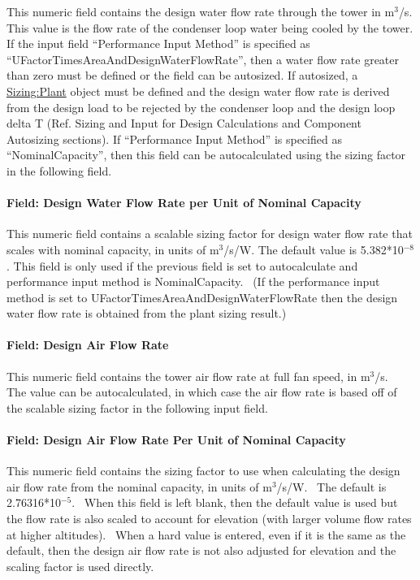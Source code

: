 This numeric field contains the design water flow rate through the tower in m\(^{3}\)/s. This value is the flow rate of the condenser loop water being cooled by the tower. If the input field ``Performance Input Method'' is specified as ``UFactorTimesAreaAndDesignWaterFlowRate'', then a water flow rate greater than zero must be defined or the field can be autosized. If autosized, a \hyperref[sizingplant]{Sizing:Plant} object must be defined and the design water flow rate is derived from the design load to be rejected by the condenser loop and the design loop delta T (Ref. Sizing and Input for Design Calculations and Component Autosizing sections). If ``Performance Input Method'' is specified as ``NominalCapacity'', then this field can be autocalculated using the sizing factor in the following field.

\paragraph{Field: Design Water Flow Rate per Unit of Nominal Capacity}\label{field-design-water-flow-rate-per-unit-of-nominal-capacity}

This numeric field contains a scalable sizing factor for design water flow rate that scales with nominal capacity, in units of m\(^{3}\)/s/W. The default value is 5.382*10\(^{-8}\). This field is only used if the previous field is set to autocalculate and performance input method is NominalCapacity.~ (If the performance input method is set to UFactorTimesAreaAndDesignWaterFlowRate then the design water flow rate is obtained from the plant sizing result.)

\paragraph{Field: Design Air Flow Rate}\label{field-design-air-flow-rate-1}

This numeric field contains the tower air flow rate at full fan speed, in m\(^{3}\)/s.~ The value can be autocalculated, in which case the air flow rate is based off of the scalable sizing factor in the following input field.

\paragraph{Field: Design Air Flow Rate Per Unit of Nominal Capacity}\label{field-design-air-flow-rate-per-unit-of-nominal-capacity}

This numeric field contains the sizing factor to use when calculating the design air flow rate from the nominal capacity, in units of m\(^{3}\)/s/W.~ The default is 2.76316*10\(^{-5}\).~ When this field is left blank, then the default value is used but the flow rate is also scaled to account for elevation (with larger volume flow rates at higher altitudes).~ When a hard value is entered, even if it is the same as the default, then the design air flow rate is not also adjusted for elevation and the scaling factor is used directly.

